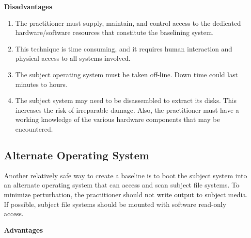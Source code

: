 \documentclass[10pt]{article}
\begin{document}
  \textbf{Disadvantages}

\begin{enumerate}

  \item
  The practitioner must supply, maintain, and control access to the
  dedicated hardware/software resources that constitute the baselining
  system.

  \item
  This technique is time consuming, and it requires human interaction
  and physical access to all systems involved.

  \item
  The subject operating system must be taken off-line.  Down time
  could last minutes to hours.

  \item
  The subject system may need to be disassembled to extract its disks.
  This increases the risk of irreparable damage.  Also, the
  practitioner must have a working knowledge of the various hardware
  components that may be encountered.

\end{enumerate}

\subsection{Alternate Operating System}

Another relatively safe way to create a baseline is to boot the
subject system into an alternate operating system that can access and
scan subject file systems.  To minimize perturbation, the practitioner
should not write output to subject media.  If possible, subject file
systems should be mounted with software read-only access.

  \textbf{Advantages}
\end{document}
